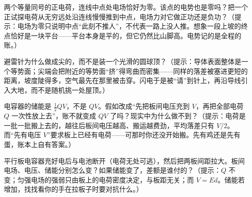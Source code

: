\begin{puzzles}
\item 两个等量同号的正电荷，连线中点处电场恰好为零。该点的电势也是零吗？把一个正试探电荷从无穷远处沿连线慢慢推到中点，电场力对它做正功还是负功？（提示：电场为零只说明中点“此刻不推人”，不代表一路上没人推。想象一段上坡的终点恰好是一块平台——平台本身是平的，但它仍然比山脚高。电势记的是全程的账。）
\item 避雷针为什么做成尖的，而不是装一个光滑的圆球顶？（提示：导体表面整体是一个等势面；尖端会把附近的等势面“挤”得弯曲而密集——同样的落差被塞进更短的距离，坡度陡得多，空气最先在那里被击穿。闪电于是被“请”到针上，再沿导线引入大地，而不是随机挑一处屋顶。）
\item 电容器的储能是 \(\frac12 QV\)，不是 \(QV\)。假如改成“先把板间电压充到 \(V\)，再把全部电荷 \(Q\) 一次性放上去”，账不就变成 \(QV\) 了吗？现实中为什么做不到？（提示：电荷是一批一批搬上去的，越往后板间电压越高、搬运越费劲，平均落差只有 \(V/2\)。而“先有电压 \(V\)”要求板上已经有电荷——可那时你还没开始搬。先有鸡还是先有蛋，账本上自有答案。）
\item 平行板电容器充好电后与电池断开（电荷无处可逃），然后把两板间距拉大。板间电场、电压、储能分别怎么变？如果储能变了，差额是谁付的？（提示：\(Q\) 不变；匀强电场的强弱只由板上的电荷密度决定，与板距无关；而 \(V=Ed\)。储能若增加，找找看你的手在拉板子时要对抗什么。）
\end{puzzles}
